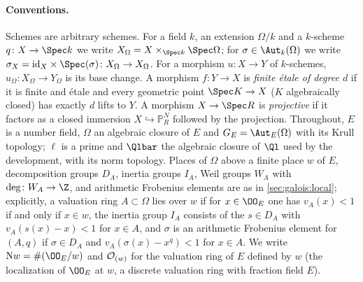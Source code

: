 \paragraph{Conventions.}
Schemes are arbitrary schemes. For a field $k$, an extension $\Omega/k$ and a $k$-scheme
$q\colon X\to\Spec k$ we write $X_\Omega=X\times_{\Spec k}\Spec\Omega$; for $\sigma\in\Aut_k(\Omega)$
we write $\sigma_X=\mathrm{id}_X\times\Spec(\sigma)\colon X_\Omega\to X_\Omega$. For a morphism
$u\colon X\to Y$ of $k$-schemes, $u_\Omega\colon X_\Omega\to Y_\Omega$ is its base change. A
morphism $f\colon Y\to X$ is \emph{finite \'etale of degree $d$} if it is finite and \'etale and
every geometric point $\Spec K\to X$ ($K$ algebraically closed) has exactly $d$ lifts to $Y$. A
morphism $X\to\Spec R$ is \emph{projective} if it factors as a closed immersion
$X\hookrightarrow\mathbb P^N_R$ followed by the projection. Throughout, $E$ is a number field,
$\Omega$ an algebraic closure of $E$ and $G_E=\Aut_E(\Omega)$ with its Krull topology; $\ell$ is a
prime and $\Qlbar$ the algebraic closure of $\Ql$ used by the development, with its norm topology.
Places of $\Omega$ above a finite place $w$ of $E$, decomposition groups $D_A$, inertia groups
$I_A$, Weil groups $W_A$ with $\deg\colon W_A\to\Z$, and arithmetic Frobenius elements are as in
\cref{sec:galois:local}; explicitly, a valuation ring $A\subset\Omega$ lies over $w$ if for
$x\in\OO_E$ one has $v_A(x)<1$ if and only if $x\in w$, the inertia group $I_A$ consists of the
$s\in D_A$ with $v_A(s(x)-x)<1$ for $x\in A$, and $\sigma$ is an arithmetic Frobenius element for
$(A,q)$ if $\sigma\in D_A$ and $v_A(\sigma(x)-x^q)<1$ for $x\in A$. We write
$\stepsiiNw=\#(\OO_E/w)$ and $\mathcal{O}_{(w)}$ for the valuation ring of $E$ defined by $w$ (the
localization of $\OO_E$ at $w$, a discrete valuation ring with fraction field $E$).

